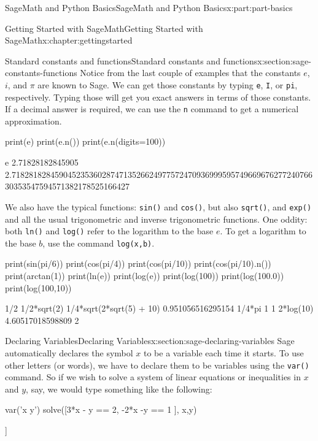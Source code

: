 \documentclass[oneside,10pt,]{book}
\newcommand{\mono}[1]{\texttt{#1}}
\numberwithin{equation}{section}
\begin{document}
\begin{partptx}{SageMath and Python Basics}{}{SageMath and Python Basics}{}{}{x:part:part-basics}
\begin{chapterptx}{Getting Started with SageMath}{}{Getting Started with SageMath}{}{}{x:chapter:gettingstarted}
\begin{sectionptx}{Standard constants and functions}{}{Standard constants and functions}{}{}{x:section:sage-constants-functions}
Notice from the last couple of examples that the constants \(e\), \(i\), and \(\pi\) are known to Sage. We can get those constants by typing \mono{e}, \mono{I}, or \mono{pi}, respectively. Typing those will get you exact answers in terms of those constants. If a decimal answer is required, we can use the \mono{n} command to get a numerical approximation.%
\begin{sageinput}
print(e)
print(e.n())
print(e.n(digits=100))
\end{sageinput}
\begin{sageoutput}
e
2.71828182845905
2.718281828459045235360287471352662497757247093699959574966967627724076630353547594571382178525166427
\end{sageoutput}
We also have the typical functions: \mono{sin()} and \mono{cos()}, but also \mono{sqrt()}, and \mono{exp()} and all the usual trigonometric and inverse trigonometric functions. One oddity: both \mono{ln()} and \mono{log()} refer to the logarithm to the base \(e\). To get a logarithm to the base \(b\), use the command \mono{log(x,b)}.%
\begin{sageinput}
print(sin(pi/6))
print(cos(pi/4))
print(cos(pi/10))
print(cos(pi/10).n())
print(arctan(1))
print(ln(e))
print(log(e))
print(log(100))
print(log(100.0))
print(log(100,10))
\end{sageinput}
\begin{sageoutput}
1/2
1/2*sqrt(2)
1/4*sqrt(2*sqrt(5) + 10)
0.951056516295154
1/4*pi
1
1
2*log(10)
4.60517018598809
2
\end{sageoutput}
\end{sectionptx}
%
%
\typeout{************************************************}
\typeout{************************************************}
%
\begin{sectionptx}{Declaring Variables}{}{Declaring Variables}{}{}{x:section:sage-declaring-variables}
Sage automatically declares the symbol \(x\) to be a variable each time it starts. To use other letters (or words), we have to declare them to be variables using the \mono{var()} command. So if we wish to solve a system of linear equations or inequalities in \(x\) and \(y\), say, we would type something like the following:%
\begin{sageinput}
var('x y')
solve([3*x - y == 2, -2*x -y == 1 ], x,y)
\end{sageinput}
\begin{sageoutput}
[[x == (1/5), y == (-7/5)]]
\end{sageoutput}
\begin{sageinput}

\end{sageinput}
\end{sectionptx}
\end{chapterptx}
\end{partptx}
\end{document}
